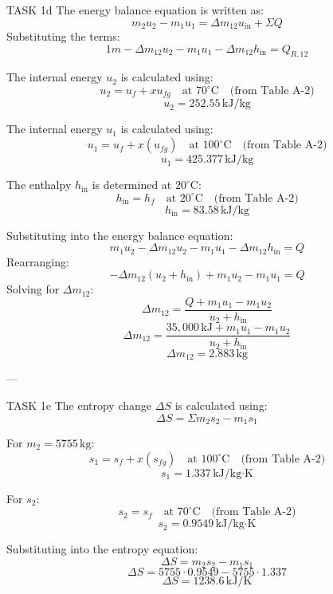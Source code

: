 TASK 1d  
The energy balance equation is written as:  
\[
m_2 u_2 - m_1 u_1 = \Delta m_{12} u_{\text{in}} + \Sigma Q
\]  
Substituting the terms:  
\[
1 m - \Delta m_{12} u_2 - m_1 u_1 - \Delta m_{12} h_{\text{in}} = Q_{R,12}
\]  

The internal energy \( u_2 \) is calculated using:  
\[
u_2 = u_f + x u_{fg} \quad \text{at } 70^\circ\text{C} \quad \text{(from Table A-2)}
\]  
\[
u_2 = 252.55 \, \text{kJ/kg}
\]  

The internal energy \( u_1 \) is calculated using:  
\[
u_1 = u_f + x (u_{fg}) \quad \text{at } 100^\circ\text{C} \quad \text{(from Table A-2)}
\]  
\[
u_1 = 425.377 \, \text{kJ/kg}
\]  

The enthalpy \( h_{\text{in}} \) is determined at \( 20^\circ\text{C} \):  
\[
h_{\text{in}} = h_f \quad \text{at } 20^\circ\text{C} \quad \text{(from Table A-2)}
\]  
\[
h_{\text{in}} = 83.58 \, \text{kJ/kg}
\]  

Substituting into the energy balance equation:  
\[
m_1 u_2 - \Delta m_{12} u_2 - m_1 u_1 - \Delta m_{12} h_{\text{in}} = Q
\]  
Rearranging:  
\[
-\Delta m_{12} (u_2 + h_{\text{in}}) + m_1 u_2 - m_1 u_1 = Q
\]  
Solving for \( \Delta m_{12} \):  
\[
\Delta m_{12} = \frac{Q + m_1 u_1 - m_1 u_2}{u_2 + h_{\text{in}}}
\]  
\[
\Delta m_{12} = \frac{35,000 \, \text{kJ} + m_1 u_1 - m_1 u_2}{u_2 + h_{\text{in}}}
\]  
\[
\Delta m_{12} = 2.883 \, \text{kg}
\]  

---

TASK 1e  
The entropy change \( \Delta S \) is calculated using:  
\[
\Delta S = \Sigma m_2 s_2 - m_1 s_1
\]  

For \( m_2 = 5755 \, \text{kg} \):  
\[
s_1 = s_f + x (s_{fg}) \quad \text{at } 100^\circ\text{C} \quad \text{(from Table A-2)}
\]  
\[
s_1 = 1.337 \, \text{kJ/kg·K}
\]  

For \( s_2 \):  
\[
s_2 = s_f \quad \text{at } 70^\circ\text{C} \quad \text{(from Table A-2)}
\]  
\[
s_2 = 0.9549 \, \text{kJ/kg·K}
\]  

Substituting into the entropy equation:  
\[
\Delta S = m_2 s_2 - m_1 s_1
\]  
\[
\Delta S = 5755 \cdot 0.9549 - 5755 \cdot 1.337
\]  
\[
\Delta S = 1238.6 \, \text{kJ/K}
\]  

